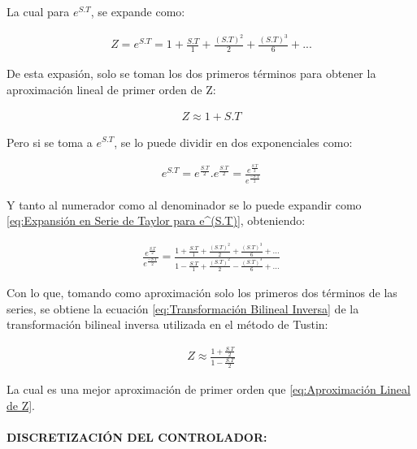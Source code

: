 \documentclass{article}
\begin{document}
\begin{sloppypar}
La cual para $e^{S.T}$, se expande como:

\begin{align}   \label{eq:Expansión en Serie de Taylor para e^(S.T)}
    Z=e^{S.T}=1+\frac{S.T}{1}+\frac{\left(S.T\right)^2}{2}+\frac{\left(S.T\right)^3}{6}+...
\end{align}

De esta expasión, solo se toman los dos primeros términos para obtener la aproximación lineal de primer orden de Z:

\begin{align}   \label{eq:Aproximación Lineal de Z}
    Z \approx 1+S.T
\end{align}

Pero si se toma a $e^{S.T}$, se lo puede dividir en dos exponenciales como:

\begin{align}   \label{eq:Artificio Matemático}
    e^{S.T}=e^{\frac{S.T}{2}}.e^{\frac{S.T}{2}}=\frac{e^{\frac{S.T}{2}}}{e^{\frac{-S.T}{2}}}
\end{align}

Y tanto al numerador como al denominador se lo puede expandir como \ref{eq:Expansión en Serie de Taylor para e^(S.T)}, obteniendo:

\begin{align}   \label{eq:Mejor Aproximación}
    \frac{e^{\frac{S.T}{2}}}{e^{\frac{-S.T}{2}}}=\frac{1+\frac{S.T}{1}+\frac{\left(S.T\right)^2}{2}+\frac{\left(S.T\right)^3}{6}+...}{1-\frac{S.T}{1}+\frac{\left(S.T\right)^2}{2}-\frac{\left(S.T\right)^3}{6}+...}
\end{align}

Con lo que, tomando como aproximación solo los primeros dos términos de las series, se obtiene la ecuación \ref{eq:Transformación Bilineal Inversa} de la transformación bilineal inversa utilizada en el método de Tustin:

\begin{align}   \label{eq:Transformación Bilineal Inversa Demostrada}
    Z \approx \frac{1+\frac{S.T}{2}}{1-\frac{S.T}{2}}
\end{align}

La cual es una mejor aproximación de primer orden que \ref{eq:Aproximación Lineal de Z}.


\paragraph{DISCRETIZACIÓN DEL CONTROLADOR:}
\label{sec:DISCRETIZACIÓN DEL CONTROLADOR:}
\hfill


\end{sloppypar}
\end{document}
